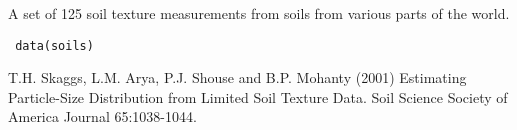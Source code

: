 \begin{Description}\relax
A set of 125 soil texture measurements from soils from various parts of the
world.
\end{Description}
\begin{Usage}
\begin{verbatim}
 data(soils)
\end{verbatim}
\end{Usage}
\begin{Source}\relax
T.H. Skaggs, L.M. Arya, P.J. Shouse and B.P. Mohanty (2001)
Estimating Particle-Size Distribution from Limited Soil Texture Data.
Soil Science Society of America Journal 65:1038-1044.
\end{Source}

